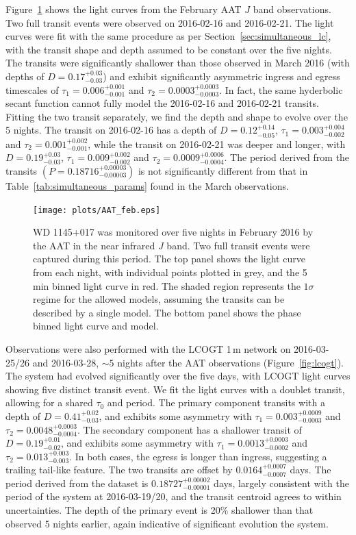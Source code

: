 \documentclass[iop,useAMES,usenatbig]{emulateapj}
\begin{document}
Figure~\ref{fig:lc_201602} shows the light curves from the February AAT $J$ band observations. Two full transit events were observed on 2016-02-16 and 2016-02-21. The light curves were fit with the same procedure as per Section~\ref{sec:simultaneous_lc}, with the transit shape and depth assumed to be constant over the five nights. The transits were significantly shallower than those observed in March 2016 (with depths of $D=0.17_{-0.03}^{+0.03}$) and exhibit significantly asymmetric ingress and egress timescales of $\tau_1 = 0.006_{-0.001}^{+0.001}$ and $\tau_2 = 0.0003_{-0.0003}^{+0.0003}$. In fact, the same hyderbolic secant function cannot fully model the 2016-02-16 and 2016-02-21 transits. Fitting the two transit separately, we find the depth and shape to evolve over the 5 nights. The transit on 2016-02-16 has a depth of $D = 0.12_{-0.05}^{+0.14}$, $\tau_1 = 0.003_{-0.002}^{+0.004}$ and $\tau_2 = 0.001_{-0.001}^{+0.002}$, while the transit on 2016-02-21 was deeper and longer, with $D = 0.19_{-0.03}^{+0.03}$, $\tau_1 = 0.009_{-0.002}^{+0.002}$ and $\tau_2 = 0.0009_{-0.0004}^{+0.0006}$. The period derived from the transits $(P=0.18716_{-0.00003}^{+0.00003})$ is not significantly different from that in Table~\ref{tab:simultaneous_params} found in the March observations. 

\begin{figure}
    \centering
    \texttt{[image: plots/AAT\_feb.eps]}
    \caption{WD 1145+017 was monitored over five nights in February 2016 by the AAT in the near infrared $J$ band. Two full transit events were captured during this period. The top panel shows the light curve from each night, with individual points plotted in grey, and the 5 min binned light curve in red. The shaded region represents the $1\sigma$ regime for the allowed models, assuming the transits can be described by a single model. The bottom panel shows the phase binned light curve and model.}
    \label{fig:lc_201602}
\end{figure}

Observations were also performed with the LCOGT 1\,m network on 2016-03-25/26 and 2016-03-28, $\sim 5$ nights after the AAT observations (Figure~\ref{fig:lcogt}). The system had evolved significantly over the five days, with LCOGT light curves showing five distinct transit event. We fit the light curves with a doublet transit, allowing for a shared $\tau_0$ and period. The primary component transits with a depth of $D = 0.41_{-0.03}^{+0.02}$, and exhibits some asymmetry with $\tau_1 = 0.003_{-0.0003}^{+0.0009}$ and $\tau_2 = 0.0048_{-0.0004}^{+0.0003}$. The secondary component has a shallower transit of $D = 0.19_{-0.02}^{+0.01}$, and exhibits some asymmetry with $\tau_1 = 0.0013_{-0.0002}^{+0.0003}$ and $\tau_2 = 0.013_{-0.003}^{+0.003}$. In both cases, the egress is longer than ingress, suggesting a trailing tail-like feature. The two transits are offset by $0.0164_{-0.0007}^{+0.0007}$ days. The period derived from the dataset is $0.18727_{-0.00001}^{+0.00002}$ days, largely consistent with the period of the system at 2016-03-19/20, and the transit centroid agrees to within uncertainties. The depth of the primary event is 20\% shallower than that observed 5 nights earlier, again indicative of significant evolution the system. 
\end{document}
